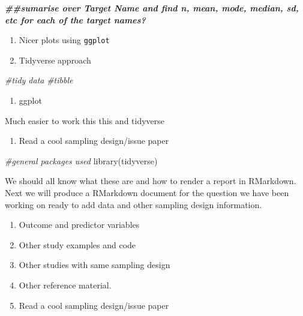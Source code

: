 \documentclass[
]{book}
\newenvironment{Shaded}{\begin{snugshade}}{\end{snugshade}}
\newcommand{\CommentTok}[1]{\textcolor[rgb]{0.56,0.35,0.01}{\textit{#1}}}
\newcommand{\DocumentationTok}[1]{\textcolor[rgb]{0.56,0.35,0.01}{\textbf{\textit{#1}}}}
\newcommand{\FunctionTok}[1]{\textcolor[rgb]{0.00,0.00,0.00}{#1}}
\newcommand{\NormalTok}[1]{#1}
\providecommand{\tightlist}{%
  \setlength{\itemsep}{0pt}\setlength{\parskip}{0pt}}
\begin{document}
\begin{Shaded}
\begin{Highlighting}[]
\DocumentationTok{\#\#sumarise over Target Name and find n, mean, mode, median, sd, etc for each of the target names?}
\end{Highlighting}
\end{Shaded}

\begin{enumerate}
\def\labelenumi{\arabic{enumi}.}
\setcounter{enumi}{5}
\item
  Nicer plots using \texttt{ggplot}
\item
  Tidyverse approach
\end{enumerate}

\begin{Shaded}
\begin{Highlighting}[]
\CommentTok{\#tidy data}
\CommentTok{\#tibble}
\end{Highlighting}
\end{Shaded}

\begin{enumerate}
\def\labelenumi{\arabic{enumi}.}
\setcounter{enumi}{5}
\tightlist
\item
  ggplot
\end{enumerate}

Much easier to work this this and tidyverse

\begin{enumerate}
\def\labelenumi{\arabic{enumi}.}
\setcounter{enumi}{6}
\tightlist
\item
  Read a cool sampling design/issue paper
\end{enumerate}

\begin{Shaded}
\begin{Highlighting}[]
\CommentTok{\#general packages used}
\FunctionTok{library}\NormalTok{(tidyverse)}
\end{Highlighting}
\end{Shaded}

We should all know what these are and how to render a report in RMarkdown. Next we will produce a RMarkdown document for the question we have been working on ready to add data and other sampling design information.

\begin{enumerate}
\def\labelenumi{\arabic{enumi}.}
\tightlist
\item
  Outcome and predictor variables
\item
  Other study examples and code
\item
  Other studies with same sampling design
\item
  Other reference material.
\item
  Read a cool sampling design/issue paper
\end{enumerate}
\end{document}

